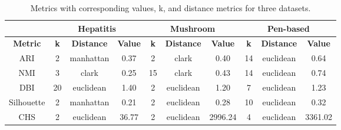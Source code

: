 \begin{table}[h!]
    \centering
    \begin{tabular}{|c|ccc|ccc|ccc|}
        \hline
                        & \multicolumn{3}{c|}{\textbf{Hepatitis}} & \multicolumn{3}{c|}{\textbf{Mushroom}} & \multicolumn{3}{c|}{\textbf{Pen-based}} \\ \hline
        \textbf{Metric} & \textbf{k} & \textbf{Distance} & \textbf{Value} 
                        & \textbf{k} & \textbf{Distance} & \textbf{Value} 
                        & \textbf{k} & \textbf{Distance} & \textbf{Value} \\ \hline
        ARI            & 2          & manhattan         & 0.37 
                       & 2          & clark         & 0.40 
                       & 14          & euclidean             & 0.64 \\ \hline
        NMI            & 3          & clark             & 0.25 
                       & 15          & clark         & 0.43 
                       & 14          & euclidean         & 0.74 \\ \hline
        DBI            & 20         & euclidean         & 1.40 
                       & 2         & euclidean             & 1.20 
                       & 7         & euclidean         & 1.23 \\ \hline
        Silhouette     & 2          & manhattan         & 0.21 
                       & 2          & euclidean         & 0.28 
                       & 10          & euclidean             & 0.32 \\ \hline
        CHS            & 2          & euclidean         & 36.77 
                       & 2          & euclidean         & 2996.24 
                       & 4          & euclidean         & 3361.02 \\ \hline
    \end{tabular}
    \caption{Metrics with corresponding values, k, and distance metrics for three datasets.}
    \label{tab:kmeans:best_runs}
\end{table}

